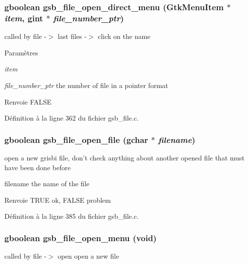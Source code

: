 \subsubsection[{gsb\_\-file\_\-open\_\-direct\_\-menu}]{\setlength{\rightskip}{0pt plus 5cm}gboolean gsb\_\-file\_\-open\_\-direct\_\-menu (GtkMenuItem $\ast$ {\em item}, \/  gint $\ast$ {\em file\_\-number\_\-ptr})}\label{gsb__file_8c_ae81c7e970f67f50db0660466c2a05ac3}
called by file -\/$>$ last files -\/$>$ click on the name


\begin{DoxyParams}{Paramètres}
\item[{\em item}]\item[{\em file\_\-number\_\-ptr}]the number of file in a pointer format\end{DoxyParams}
\begin{DoxyReturn}{Renvoie}
FALSE 
\end{DoxyReturn}


Définition à la ligne 362 du fichier gsb\_\-file.c.

\subsubsection[{gsb\_\-file\_\-open\_\-file}]{\setlength{\rightskip}{0pt plus 5cm}gboolean gsb\_\-file\_\-open\_\-file (gchar $\ast$ {\em filename})}\label{gsb__file_8c_a2fe6126d5b7bb969ed720deca0e4ce89}
open a new grisbi file, don't check anything about another opened file that must have been done before

filename the name of the file

\begin{DoxyReturn}{Renvoie}
TRUE ok, FALSE problem 
\end{DoxyReturn}


Définition à la ligne 385 du fichier gsb\_\-file.c.

\subsubsection[{gsb\_\-file\_\-open\_\-menu}]{\setlength{\rightskip}{0pt plus 5cm}gboolean gsb\_\-file\_\-open\_\-menu (void)}\label{gsb__file_8c_ae6bf4262fe73b7727f10eddb0c835b73}
called by file -\/$>$ open open a new file


